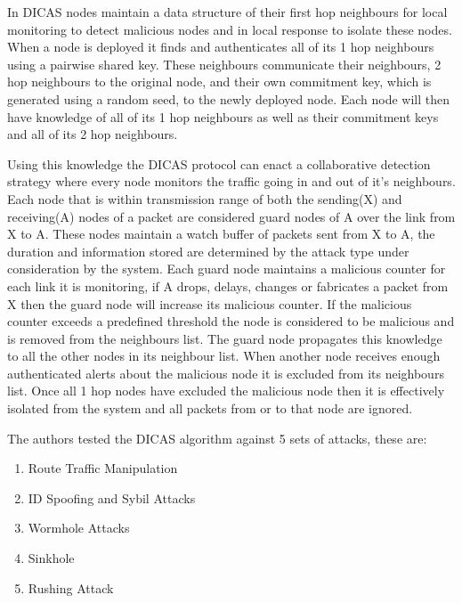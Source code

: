 In DICAS nodes maintain a data structure of their first hop neighbours for local monitoring to detect malicious nodes and in local response to isolate these nodes. When a node is deployed it finds and authenticates all of its 1 hop neighbours using a pairwise shared key. These neighbours communicate their neighbours, 2 hop neighbours to the original node, and their own commitment key, which is generated using a random seed, to the newly deployed node. Each node will then have knowledge of all of its 1 hop neighbours as well as their commitment keys and all of its 2 hop neighbours.

Using this knowledge the DICAS protocol can enact a collaborative detection strategy where every node monitors the traffic going in and out of it's neighbours. Each node that is within transmission range of both the sending(X) and receiving(A) nodes of a packet are considered guard nodes of A over the link from X to A. These nodes maintain a watch buffer of packets sent from X to A, the duration and information stored are determined by the attack type under consideration by the system. Each guard node maintains a malicious counter for each link it is monitoring, if A drops, delays, changes or fabricates a packet from X then the guard node will increase its malicious counter. If the malicious counter exceeds a predefined threshold the node is considered to be malicious and is removed from the neighbours list. The guard node propagates this knowledge to all the other nodes in its neighbour list. When another node receives enough authenticated alerts about the malicious node it is excluded from its neighbours list. Once all 1 hop nodes have excluded the malicious node then it is effectively isolated from the system and all packets from or to that node are ignored.      

The authors tested the DICAS algorithm against 5 sets of attacks, these are:
\begin{enumerate}

\item Route Traffic Manipulation

\item ID Spoofing and Sybil Attacks

\item Wormhole Attacks

\item Sinkhole

\item Rushing Attack

\end{enumerate}

